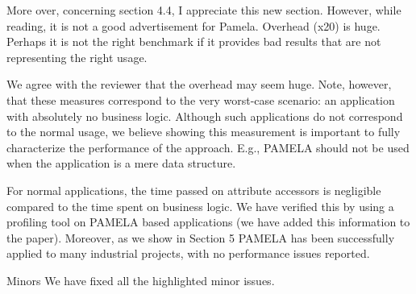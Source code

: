 \documentclass[10pt]{article}
\begin{document}
\begin{response}{More over, concerning section 4.4, I appreciate this new section. However, while reading, it is not a good advertisement for Pamela. Overhead (x20) is huge. Perhaps it is not the right benchmark if it provides bad results that are not representing the right usage.}

We agree with the reviewer that the overhead may seem huge. Note, however, that these measures correspond to the very worst-case scenario: an application with absolutely no business logic. Although such applications do not correspond to the normal usage, we believe showing this measurement is important to fully characterize the performance of the approach. E.g., PAMELA should not be used when the application is a mere data structure.

For normal applications, the time passed on attribute accessors is negligible compared to the time spent on business logic. We have verified this by using a profiling tool on PAMELA based applications (we have added this information to the paper). Moreover, as we show in Section 5 PAMELA has been successfully applied to many industrial projects, with no performance issues reported. 

\end{response}

\begin{response}{Minors}
We have fixed all the highlighted minor issues.
\end{response}
\end{document}
